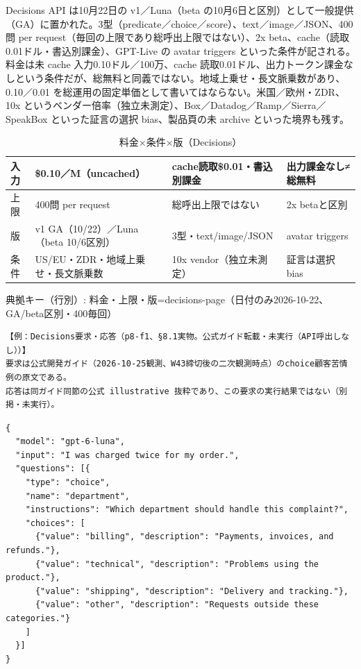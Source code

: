 \documentclass[lualatex,a4paper,10pt]{jlreq}
\begin{document}
Decisions API は10月22日の v1／Luna（beta の10月6日と区別）として一般提供（GA）に置かれた。3型（predicate／choice／score）、text／image／JSON、400問 per request（毎回の上限であり総呼出上限ではない）、2x beta、cache（読取0.01ドル・書込別課金）、GPT-Live の avatar triggers といった条件が記される。料金は未 cache 入力0.10ドル／100万、cache 読取0.01ドル、出力トークン課金なしという条件だが、総無料と同義ではない。地域上乗せ・長文脈乗数があり、0.10／0.01 を総運用の固定単価として書いてはならない。米国／欧州・ZDR、10x というベンダー倍率（独立未測定）、Box／Datadog／Ramp／Sierra／SpeakBox といった証言の選択 bias、製品頁の未 archive といった境界も残す。


\begin{table}[htbp]\centering\footnotesize
\caption{料金×条件×版（Decisions）}
\begin{tabularx}{0.96\linewidth}{@{}lXXX@{}}
\toprule
入力 & \$0.10／M（uncached） & cache読取\$0.01・書込別課金 & 出力課金なし≠総無料 \\
\midrule
上限 & 400問 per request & 総呼出上限ではない & 2x betaと区別 \\
版 & v1 GA（10/22）／Luna（beta 10/6区別） & 3型・text/image/JSON & avatar triggers \\
条件 & US/EU・ZDR・地域上乗せ・長文脈乗数 & 10x vendor（独立未測定） & 証言は選択bias \\
\bottomrule
\end{tabularx}
{\scriptsize\color{SurveyMuted} 典拠キー（行別）: 料金・上限・版=decisions-page（日付のみ2026-10-22、GA/beta区別・400毎回）\par}
\end{table}


\begin{verbatim}
【例：Decisions要求・応答（p8-f1、§8.1実物。公式ガイド転載・未実行（API呼出しなし））】
要求は公式開発ガイド（2026-10-25観測、W43締切後の二次観測時点）のchoice顧客苦情例の原文である。
応答は同ガイド同節の公式 illustrative 抜粋であり、この要求の実行結果ではない（別掲・未実行）。
\end{verbatim}


\begin{verbatim}
{
  "model": "gpt-6-luna",
  "input": "I was charged twice for my order.",
  "questions": [{
    "type": "choice",
    "name": "department",
    "instructions": "Which department should handle this complaint?",
    "choices": [
      {"value": "billing", "description": "Payments, invoices, and refunds."},
      {"value": "technical", "description": "Problems using the product."},
      {"value": "shipping", "description": "Delivery and tracking."},
      {"value": "other", "description": "Requests outside these categories."}
    ]
  }]
}
\end{verbatim}
\end{document}

